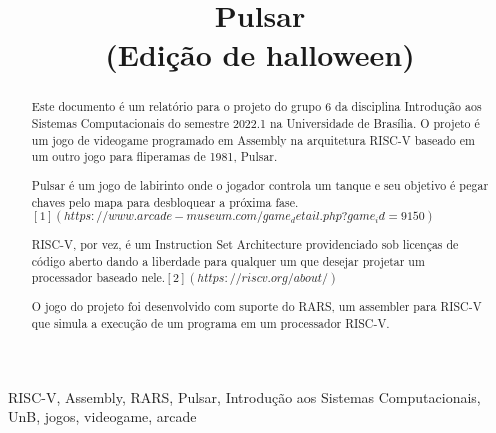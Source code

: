 \documentclass[conference]{IEEEtran}
\begin{document}
\title{Pulsar\\
(Edição de halloween)}

\author{
\and
{}
\and
{}
}

\maketitle

\begin{abstract}
Este documento é um relatório para o projeto do grupo 6 da disciplina Introdução aos Sistemas Computacionais do semestre 2022.1 na Universidade de Brasília. O projeto é um jogo de videogame programado em Assembly na arquitetura RISC-V baseado em um outro jogo para fliperamas de 1981, Pulsar. 

Pulsar é um jogo de labirinto onde o jogador controla um tanque e seu objetivo é pegar chaves pelo mapa para desbloquear a próxima fase.$[1](https://www.arcade-museum.com/game_detail.php?game_id=9150)$

RISC-V, por vez, é um Instruction Set Architecture providenciado sob licenças de código aberto dando a liberdade para qualquer um que desejar projetar um processador baseado nele.$[2](https://riscv.org/about/)$

O jogo do projeto foi desenvolvido com suporte do RARS, um assembler para RISC-V que simula a execução de um programa em um processador RISC-V.
\end{abstract}

\begin{IEEEkeywords}
RISC-V, Assembly, RARS, Pulsar, Introdução aos Sistemas Computacionais, UnB, jogos, videogame, arcade
\end{IEEEkeywords}
\end{document}
